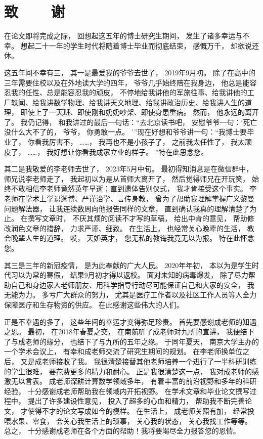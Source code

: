\chapter{致~~~~谢}

在论文即将完成之际，
回想起这五年的博士研究生期间，
发生了诸多幸运与不幸。
想起二十一年的学生时代将随着博士毕业而彻底结束，
感慨万千，
却欲说还休。

这五年间不幸有三，
其一是最爱我的爷爷去世了，
2019年9月初。
除了在高中的三年需要住校以及在外地读大学的四年，
爷爷几乎始终陪在我身边，
他总是能容忍我的任性、总是能容忍我的顽皮，
不停地给我讲他的军旅往事、给我讲他的工厂轶闻、给我讲数学物理、给我讲天文地理、给我讲政治历史、给我讲人生的道理，
即使上了一天班、即使刚和奶奶吵架、即使身患重病。
然而，
他永远的离开了。
我仍记得，
和我讲过的最后一句话：“去北京读书吧，
安慰爷爷一句：‘死亡没什么大不了的，
爷爷，
你勇敢一点。
’”现在好想和爷爷讲一句：“我博士要毕业了，
你看我厉害不，
……，
我再也不是小孩子了，
之前我太任性了，
我太顽皮了，
……，
我好想让你看我成家立业的样子。
”特在此思念您。

其二是我敬爱的李老师去世了，
2023年5月中旬。
最初得知消息是在微信群中，
师兄说李老师走了，
我起初以为是从首师大离开了，
然后觉得师兄在开玩笑，
始终不敢相信李老师竟然英年早逝；直到遗体告别仪式，
我才肯接受这个事实。
李老师在学术上学识渊博、严谨治学、言传身教，
曾为了帮助我理解掌握广义黎曼问题解法器，
让我连续数周向他报告同样的文章，
直到确认我真的理解清楚了为止。
在撰写文章时，
不厌其烦的阅读不才写的草稿，
给出中肯的意见，
帮助修改润色文章的措辞，
力求严谨、细致。
在生活上，
也经常关心晚辈的生活，
教会晚辈人生的道理。
哎，
天妒英才，
您无私的教诲我竟无以为报。
特在此怀念您。

其三是三年的新冠疫情，
是为此奉献的广大人民。
2020年年初，
本以为是学生时代习以为常的寒假，
结果9月初才得以返校。
面对未知的病毒爆发，
除了尽力帮助自己和身边家人老师朋友、用科学指导行动尽可能保证自己和大家的安全，
我无能为力。
多亏广大群众的努力，
尤其是医疗工作者以及社区工作人员等人全力保障医疗和生存物资的供应。
在此感谢这些伟大的人们。

正是不幸遇的多了，
这些年间的幸运才变得弥足珍贵。
首先要感谢成老师的知遇之恩。
最初，
在2018年春夏之交，
在南航听了成老师对九所的宣讲，
我便结下了与成老师的缘分，
也结下了与九所的五年之缘。
于同年夏天，
南京大学主办的一个学术会议上，
有幸和成老师交流了研究生期间的规划。
在李老师换单位之后，
又是成老师接收了我。
我很清楚接替其他老师培养一个进行了一半科研训练的学生很难，
要花费更多的精力和耐心。
正是我很清楚这一点，
我对成老师的感激无以言表。
成老师深耕计算数学领域多年，
有着丰富的前沿视野和多年的科研经验，
十分感谢成老师帮助我在领域内开拓视野。
在学术文章和毕业论文撰写过程中，
提出了许多建设性意见，
投入了超多的心血和精力，
帮助我不断完善论文，
才使得不才的论文写成如今的模样。
在生活上，
成老师关照有加，
经常投喂水果、零食，
会关心我生活上的琐事，
关心我的状态，
关心我找工作等等。
总之，
十分感谢成老师在各个方面的帮助！我将要竭尽全力报答您的恩情。

